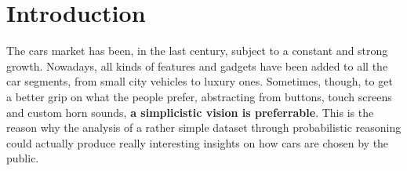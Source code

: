 \section{Introduction}
\label{sec:introduction}

The cars market has been, in the last century, subject to a constant and strong growth. Nowadays, all kinds of features and gadgets have been added to all the car segments, from small city vehicles to luxury ones. Sometimes, though, to get a better grip on what the people prefer, abstracting from buttons, touch screens and custom horn sounds, \textbf{a simplicistic vision is preferrable}. This is the reason why the analysis of a rather simple dataset through probabilistic reasoning could actually produce really interesting insights on how cars are chosen by the public.